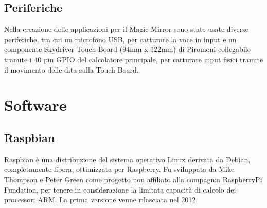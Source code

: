 \subsection{Periferiche}
Nella creazione delle applicazioni per il Magic Mirror sono state usate diverse periferiche, tra cui un microfono
USB, per catturare la voce in input e un componente Skydriver Touch Board (94mm x 122mm) di Piromoni collegabile tramite
i 40 pin GPIO del calcolatore principale, per catturare input fisici tramite il movimento delle dita sulla Touch Board.

\section{Software}
\subsection{Raspbian}
Raspbian \`e una distribuzione del sistema operativo Linux derivata da Debian, completamente libera,
ottimizzata per Raspberry.
Fu sviluppata da Mike Thompson e Peter Green come progetto non affiliato alla compagnia RaspberryPi
Fundation, per tenere in considerazione la limitata capacit\`a di calcolo dei processori ARM.
La prima versione venne rilasciata nel 2012.


